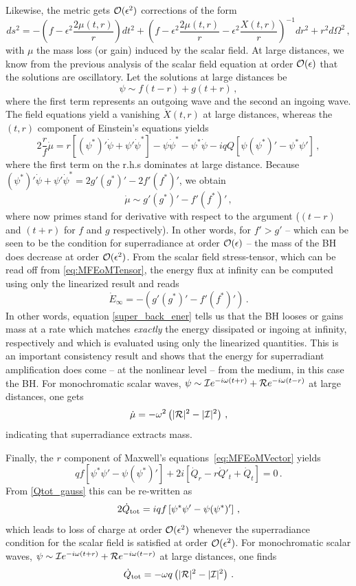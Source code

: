 \documentclass[11pt]{article}
\newcommand{\be}{\begin{equation}}
\newcommand{\ee}{\end{equation}}
\numberwithin{equation}{section} %
\begin{document}
Likewise, the metric gets ${\cal O}(\epsilon^2)$ corrections of the form
%
\be
ds^2=-\left(f-\epsilon^2\frac{2\mu(t,r)}{r}\right)dt^2+\left(f-\epsilon^2\frac{2\mu(t,r)}{r}-\epsilon^2\frac{X(t,r)}{r}\right)^{-1}dr^2+r^2d\Omega^2\,,
\ee
%
with $\mu$ the mass loss (or gain) induced by the scalar field.
At large distances, we know from the previous analysis of the scalar field equation at order ${\cal O}(\epsilon)$
that the solutions are oscillatory. Let the solutions at large distances be 
%
\be
\psi \sim f(t-r)+g(t+r)\,,
\ee
%
where the first term represents an outgoing wave and the second an ingoing wave. The field equations yield a vanishing $\dot X(t,r)$ at large distances, whereas the $(t,r)$ component of Einstein's equations yields
%
\be
2\frac{r}{f}\dot{\mu}=r\left[\left(\psi^*\right)'\dot{\psi}+\psi'\dot{\psi}^*\right]-\psi\dot{\psi}^*-\psi^*\dot{\psi}-iqQ\left[\psi\left(\psi^*\right)'-\psi^*\psi'\right]\,,
\ee
%
where the first term on the r.h.s dominates at large distance. Because $\left(\psi^*\right)'\dot{\psi}+\psi'\dot{\psi}^*=2g'(g^*)'-2f'(f^*)'$, we obtain
%
\be
\dot{\mu}\sim g'(g^*)'-f'(f^*)'\,,\label{super_back_ener}
\ee
%
where now primes stand for derivative with respect to the argument ($(t-r)$ and $(t+r)$ for $f$ and $g$ respectively).
In other words, for $f'>g'$ -- which can be seen to be the condition for superradiance at order ${\cal O}(\epsilon)$ --
the mass of the BH does decrease at order ${\cal O}(\epsilon^2)$. From the scalar field stress-tensor, which can be read off from \eqref{eq:MFEoMTensor}, the energy flux at infinity can be computed using only the linearized result and reads
%
\be
\dot{E}_{\infty}=-\left(g'(g^*)'-f'(f^*)'\right)\,.
\ee
%
In other words, equation \eqref{super_back_ener} tells us that the BH looses or gains mass at a rate which matches
{\it exactly} the energy dissipated or ingoing at infinity, respectively and which is evaluated using only the linearized quantities.
This is an important consistency result and shows that the energy for superradiant amplification does come -- at the nonlinear level -- from the medium, in this case the BH. For monochromatic scalar waves, $\psi\sim {\cal I}e^{-i\omega (t+r)}+{\cal R}e^{-i\omega (t-r)}$ at large distances, one gets
%
\be
\dot{\mu}=-\omega^2\left(|{\cal R}|^2-|{\cal I}|^2\right)\,,
\ee
%
indicating that superradiance extracts mass.


Finally, the $r$ component of Maxwell's equations~\eqref{eq:MFEoMVector} yields
%
\be
qf\left[\psi^*\psi'-\psi(\psi^*)'\right]+2i\left[\dot{Q}_r-r\dot{Q}'_t+\dot{Q}_t\right]=0\,.
\ee
%
From \eqref{Qtot_gauss} this can be re-written as
%
\be
2\dot{Q}_{\rm tot}=iqf\left[\psi^*\psi'-\psi(\psi^*)'\right]\,,
\ee
%
which leads to loss of charge at order ${\cal O}(\epsilon^2)$ whenever the superradiance condition for the scalar field is satisfied
at order ${\cal O}(\epsilon^2)$. For monochromatic scalar waves, $\psi\sim {\cal I} e^{-i\omega (t+r)}+{\cal R}e^{-i\omega (t-r)}$ at large distances, one finds
%
\be
\dot{Q}_{\rm tot}=-\omega q\left(|{\cal R}|^2-|{\cal I}|^2\right)\,.
\ee
%
\end{document}
